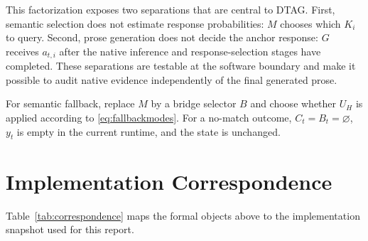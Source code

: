 \documentclass[journal]{IEEEtran}
\newcommand{\1}{\mathbf{1}}
\begin{document}
This factorization exposes two separations that are central to DTAG. First, semantic selection does not estimate response probabilities: $M$ chooses which $K_i$ to query. Second, prose generation does not decide the anchor response: $G$ receives $a_{t,i}$ after the native inference and response-selection stages have completed. These separations are testable at the software boundary and make it possible to audit native evidence independently of the final generated prose.

For semantic fallback, replace $M$ by a bridge selector $B$ and choose whether $U_H$ is applied according to \eqref{eq:fallbackmodes}. For a no-match outcome, $C_t=B_t=\varnothing$, $y_t$ is empty in the current runtime, and the state is unchanged.

\section{Implementation Correspondence}
\label{sec:correspondence}

Table~\ref{tab:correspondence} maps the formal objects above to the implementation snapshot used for this report.
\end{document}

